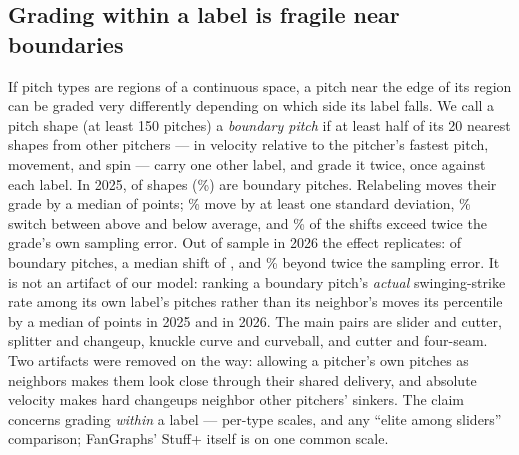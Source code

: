 \documentclass{article}
\theoremstyle{definition}
\theoremstyle{remark}
\begin{document}
\subsection{Grading within a label is fragile near boundaries}
If pitch types are regions of a continuous space, a pitch near the edge of its region can be graded very differently depending on which side its label falls.
We call a pitch shape (at least 150 pitches) a \emph{boundary pitch} if at least half of its 20 nearest shapes from other pitchers --- in velocity relative to the pitcher's fastest pitch, movement, and spin --- carry one other label, and grade it twice, once against each label.
In 2025, \LSTwentyFiveBoundary{} of \LSTwentyFiveEligible{} shapes (\LSTwentyFiveBoundaryPct\%) are boundary pitches.
Relabeling moves their grade by a median of \LSTwentyFiveShift{} points; \LSTwentyFiveOneSDPct\% move by at least one standard deviation, \LSTwentyFiveCrossPct\% switch between above and below average, and \LSTwentyFiveTwoSEPct\% of the shifts exceed twice the grade's own sampling error.
Out of sample in 2026 the effect replicates: \LSTwentySixBoundary{} of \LSTwentySixEligible{} boundary pitches, a median shift of \LSTwentySixShift, and \LSTwentySixTwoSEPct\% beyond twice the sampling error.
It is not an artifact of our model: ranking a boundary pitch's \emph{actual} swinging-strike rate among its own label's pitches rather than its neighbor's moves its percentile by a median of \LSTwentyFivePctChange{} points in 2025 and \LSTwentySixPctChange{} in 2026.
The main pairs are slider and cutter, splitter and changeup, knuckle curve and curveball, and cutter and four-seam.
Two artifacts were removed on the way: allowing a pitcher's own pitches as neighbors makes them look close through their shared delivery, and absolute velocity makes hard changeups neighbor other pitchers' sinkers.
The claim concerns grading \emph{within} a label --- per-type scales, and any ``elite among sliders'' comparison; FanGraphs' Stuff+ itself is on one common scale.
\end{document}
